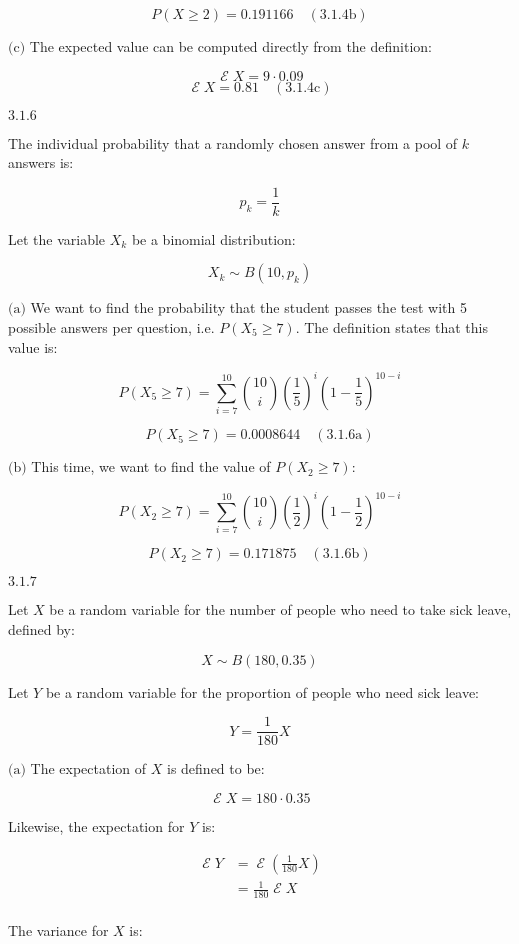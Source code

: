 \documentclass{article}
\newcommand{\problem}[2]{$\boxed{\text{#1.#2}}$}
\newcommand{\subproblem}[3]{$\boxed{\text{(#3)}}$}
\newcommand{\subsolution}[4]{\boxed{#4\quad(\text{#1.#2#3})}}
\DeclareMathOperator{\E}{\mathcal{E}}
\begin{document}
\[
\subsolution{3.1}{4}{b}{P(X\ge2) =0.191166}
\]

%
\subproblem{3.1}{4}{c} The expected value can be computed directly
from the definition:

\[
\E X=9\cdot0.09
\] \[
\subsolution{3.1}{4}{c}{\E X=0.81}
\]

%
\problem{3.1}{6}

The individual probability that a randomly chosen answer from a pool
of $k$ answers is:

\[
p_k = \frac{1}{k}
\]

Let the variable $X_k$ be a binomial distribution:

\[
X_k\sim B(10, p_k)
\]

%
\subproblem{3.1}{6}{a} We want to find the probability that the
student passes the test with 5 possible answers per question,
i.e. $P(X_5\ge7)$. The definition states that this value is:

\[
P(X_5\ge7)=\sum\limits_{i=7}^{10} \binom{10}{i} \left(\frac{1}{5}\right)^i\left(1-\frac{1}{5}\right)^{10-i}
\]

\[
\subsolution{3.1}{6}{a}{P(X_5\ge7)=0.0008644}
\]

%
\subproblem{3.1}{6}{b} This time, we want to find the value of
$P(X_2\ge7)$:

\[
P(X_2\ge7)=\sum\limits_{i=7}^{10} \binom{10}{i} \left(\frac{1}{2}\right)^i\left(1-\frac{1}{2}\right)^{10-i}
\]

\[
\subsolution{3.1}{6}{b}{P(X_2\ge7)=0.171875}
\]

%
\problem{3.1}{7}

Let $X$ be a random variable for the number of people who need to take
sick leave, defined by:

\[
X\sim B(180, 0.35)
\]

Let $Y$ be a random variable for the proportion of people who need
sick leave:

\[
Y=\frac{1}{180} X
\]

%
\subproblem{3.1}{7}{a} The expectation of $X$ is defined to be:

\[
\E X=180\cdot 0.35
\]

Likewise, the expectation for $Y$ is:

\[
\begin{array}{rl}
\E Y &= \E\left(\frac{1}{180} X\right) \\
&= \frac{1}{180}\E X \\
\end{array}
\]

The variance for $X$ is:
\end{document}
